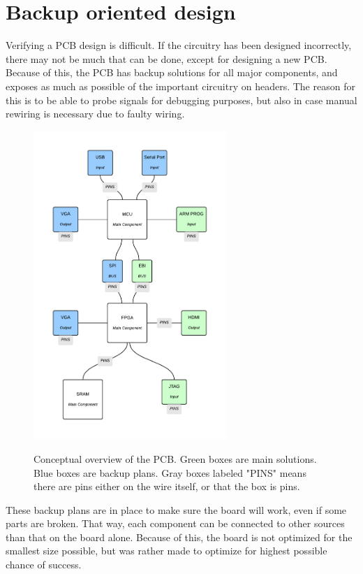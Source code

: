 \documentclass[../main/report.tex]{subfiles}
\begin{document}
\section{Backup oriented design}

Verifying a PCB design is difficult.
If the circuitry has been designed incorrectly, there may not be much that can be done, except for designing a new PCB.
Because of this, the PCB has backup solutions for all major components, and exposes as much as possible of the important circuitry on headers.
The reason for this is to be able to probe signals for debugging purposes, but also in case manual rewiring is necessary due to faulty wiring. 
\begin{figure}[H]
    \centering
    \includegraphics[width=0.65\textwidth]{../pcb/assets/pcb-overview.pdf}
    \label{fig:pcb-overview}
    \caption{Conceptual overview of the PCB. Green boxes are main solutions. Blue boxes are backup plans.
             Gray boxes labeled "PINS" means there are pins either on the wire itself, or that the box is pins.}
\end{figure}

These backup plans are in place to make sure the board will work, even if some parts are broken.
That way, each component can be connected to other sources than that on the board alone.
Because of this, the board is not optimized for the smallest size possible, but was rather made to optimize for highest possible chance of success.
\end{document}
